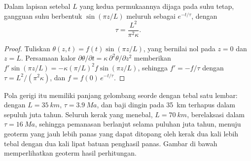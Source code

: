 \begin{proposition}\label{prop:b2:pt-paths:relaxation}
Dalam lapisan setebal $L$ yang kedua permukaannya dijaga pada suhu tetap, gangguan
suhu berbentuk $\sin(\pi z/L)$ meluruh sebagai $e^{-t/\tau}$, dengan
\[
\tau = \frac{L^2}{\pi^2\kappa}.
\]
\end{proposition}

\begin{proof}
Tuliskan $\theta(z, t) = f(t)\sin(\pi z/L)$, yang bernilai nol pada $z = 0$ dan $z = L$. Persamaan
kalor $\partial\theta/\partial t = \kappa\,\partial^2\theta/\partial z^2$ memberikan
$f'\sin(\pi z/L) = -\kappa(\pi/L)^2 f\sin(\pi z/L)$, sehingga $f' = -f/\tau$ dengan $\tau =
L^2/(\pi^2\kappa)$, dan $f = f(0)\,e^{-t/\tau}$.
\end{proof}

Pola gerigi itu memiliki panjang gelombang seorde dengan tebal satu lembar: dengan $L =
\qty{35}{km}$, $\tau = \qty{3.9}{Ma}$, dan baji dingin pada \qty{35}{km} terhapus dalam
sepuluh juta tahun. Seluruh kerak yang menebal, $L = \qty{70}{km}$, berelaksasi dalam $\tau =
\qty{16}{Ma}$, sehingga pemanasan berlanjut selama puluhan juta tahun, menuju geoterm yang jauh
lebih panas yang dapat ditopang oleh kerak dua kali lebih tebal dengan dua kali lipat batuan penghasil panas. Gambar
di bawah memperlihatkan geoterm hasil perhitungan.

\begin{omfigure}
\centering
{}
\par{}
\end{omfigure}

